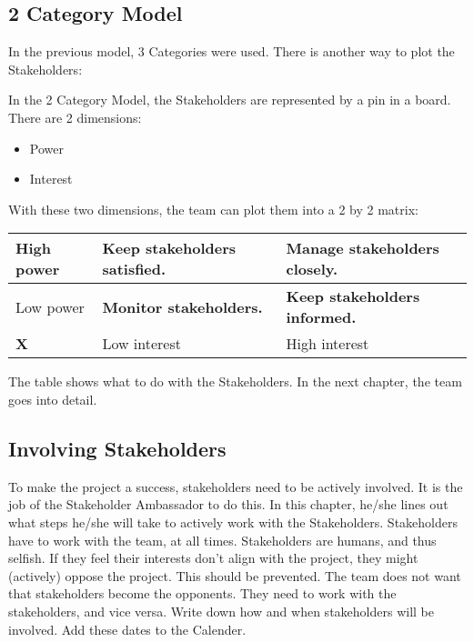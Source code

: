 \documentclass[10pt]{report}
\begin{document}
\subsection{2 Category Model}

In the previous model, 3 Categories were used. There is another way to plot the Stakeholders:

In the 2 Category Model, the Stakeholders are represented by a pin in a board. There are 2 dimensions:

\begin{itemize}
	\item Power
	\item Interest
\end{itemize}

With these two dimensions, the team can plot them into a 2 by 2 matrix:

\medskip
\begin{tabularx}{1\textwidth} { 
  | >{\raggedright\arraybackslash}l
  || >{\raggedright\arraybackslash}l
  | >{\raggedright\arraybackslash}X | }
 \hline
 High power & \textbf{Keep stakeholders satisfied.} & \textbf{Manage stakeholders closely.} \\
 \hline
 Low power & \textbf{Monitor stakeholders.} & \textbf{Keep stakeholders informed.} \\
 \hline
 \hline
 \textbf{X} & Low interest & High interest \\
 \hline
\end{tabularx}
\medskip

The table shows what to do with the Stakeholders. In the next chapter, the team goes into detail.

\subsection{Involving Stakeholders}

To make the project a success, stakeholders need to be actively involved. It is the job of the Stakeholder Ambassador to do this. In this chapter, he/she lines out what steps he/she will take to actively work with the Stakeholders. Stakeholders have to work with the team, at all times. Stakeholders are humans, and thus selfish. If they feel their interests don't align with the project, they might (actively) oppose the project. This should be prevented. The team does not want that stakeholders become the opponents. They need to work with the stakeholders, and vice versa. Write down how and when stakeholders will be involved. Add these dates to the Calender.
\end{document}
